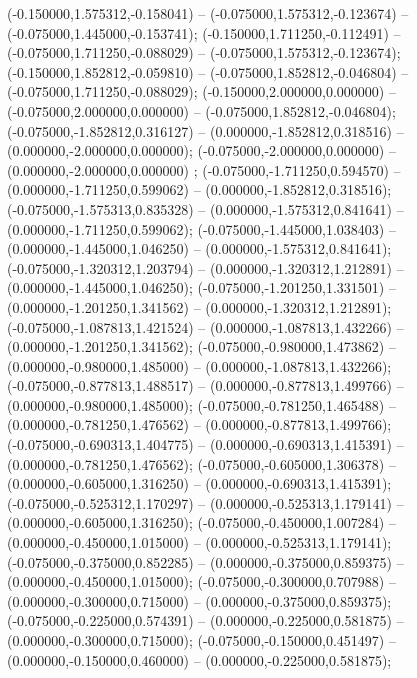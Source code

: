  (-0.150000,1.575312,-0.158041) -- (-0.075000,1.575312,-0.123674) -- (-0.075000,1.445000,-0.153741);
 (-0.150000,1.711250,-0.112491) -- (-0.075000,1.711250,-0.088029) -- (-0.075000,1.575312,-0.123674);
 (-0.150000,1.852812,-0.059810) -- (-0.075000,1.852812,-0.046804) -- (-0.075000,1.711250,-0.088029);
 (-0.150000,2.000000,0.000000) -- (-0.075000,2.000000,0.000000) -- (-0.075000,1.852812,-0.046804);
 (-0.075000,-1.852812,0.316127) -- (0.000000,-1.852812,0.318516) -- (0.000000,-2.000000,0.000000);
 (-0.075000,-2.000000,0.000000) -- (0.000000,-2.000000,0.000000) ;
 (-0.075000,-1.711250,0.594570) -- (0.000000,-1.711250,0.599062) -- (0.000000,-1.852812,0.318516);
 (-0.075000,-1.575313,0.835328) -- (0.000000,-1.575312,0.841641) -- (0.000000,-1.711250,0.599062);
 (-0.075000,-1.445000,1.038403) -- (0.000000,-1.445000,1.046250) -- (0.000000,-1.575312,0.841641);
 (-0.075000,-1.320312,1.203794) -- (0.000000,-1.320312,1.212891) -- (0.000000,-1.445000,1.046250);
 (-0.075000,-1.201250,1.331501) -- (0.000000,-1.201250,1.341562) -- (0.000000,-1.320312,1.212891);
 (-0.075000,-1.087813,1.421524) -- (0.000000,-1.087813,1.432266) -- (0.000000,-1.201250,1.341562);
 (-0.075000,-0.980000,1.473862) -- (0.000000,-0.980000,1.485000) -- (0.000000,-1.087813,1.432266);
 (-0.075000,-0.877813,1.488517) -- (0.000000,-0.877813,1.499766) -- (0.000000,-0.980000,1.485000);
 (-0.075000,-0.781250,1.465488) -- (0.000000,-0.781250,1.476562) -- (0.000000,-0.877813,1.499766);
 (-0.075000,-0.690313,1.404775) -- (0.000000,-0.690313,1.415391) -- (0.000000,-0.781250,1.476562);
 (-0.075000,-0.605000,1.306378) -- (0.000000,-0.605000,1.316250) -- (0.000000,-0.690313,1.415391);
 (-0.075000,-0.525312,1.170297) -- (0.000000,-0.525313,1.179141) -- (0.000000,-0.605000,1.316250);
 (-0.075000,-0.450000,1.007284) -- (0.000000,-0.450000,1.015000) -- (0.000000,-0.525313,1.179141);
 (-0.075000,-0.375000,0.852285) -- (0.000000,-0.375000,0.859375) -- (0.000000,-0.450000,1.015000);
 (-0.075000,-0.300000,0.707988) -- (0.000000,-0.300000,0.715000) -- (0.000000,-0.375000,0.859375);
 (-0.075000,-0.225000,0.574391) -- (0.000000,-0.225000,0.581875) -- (0.000000,-0.300000,0.715000);
 (-0.075000,-0.150000,0.451497) -- (0.000000,-0.150000,0.460000) -- (0.000000,-0.225000,0.581875);
